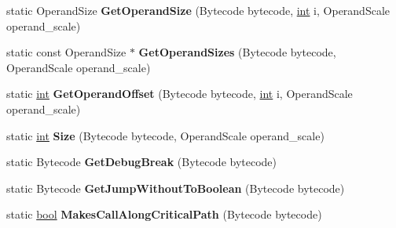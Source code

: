 \begin{DoxyCompactItemize}
\item 
\mbox{\label{classv8_1_1internal_1_1interpreter_1_1Bytecodes_a181117fa745d9bb3d84ee585c778ed94}} 
static Operand\+Size {\bfseries Get\+Operand\+Size} (Bytecode bytecode, \mbox{\hyperlink{classint}{int}} i, Operand\+Scale operand\+\_\+scale)
\item 
\mbox{\label{classv8_1_1internal_1_1interpreter_1_1Bytecodes_a83ff97f25c969cf0781233dde8d21572}} 
static const Operand\+Size $\ast$ {\bfseries Get\+Operand\+Sizes} (Bytecode bytecode, Operand\+Scale operand\+\_\+scale)
\item 
\mbox{\label{classv8_1_1internal_1_1interpreter_1_1Bytecodes_a28b2da32169415a2c614004ab991d696}} 
static \mbox{\hyperlink{classint}{int}} {\bfseries Get\+Operand\+Offset} (Bytecode bytecode, \mbox{\hyperlink{classint}{int}} i, Operand\+Scale operand\+\_\+scale)
\item 
\mbox{\label{classv8_1_1internal_1_1interpreter_1_1Bytecodes_aa36d92e9553de50e7137dcea9afaa212}} 
static \mbox{\hyperlink{classint}{int}} {\bfseries Size} (Bytecode bytecode, Operand\+Scale operand\+\_\+scale)
\item 
\mbox{\label{classv8_1_1internal_1_1interpreter_1_1Bytecodes_a73c15d2ef6e681eb36695d40f787f521}} 
static Bytecode {\bfseries Get\+Debug\+Break} (Bytecode bytecode)
\item 
\mbox{\label{classv8_1_1internal_1_1interpreter_1_1Bytecodes_a3c26a67c2ae1b3a3c13ba669cc387154}} 
static Bytecode {\bfseries Get\+Jump\+Without\+To\+Boolean} (Bytecode bytecode)
\item 
\mbox{\label{classv8_1_1internal_1_1interpreter_1_1Bytecodes_a3adceda5bd96e2e34b5a3b1f63d2aa2a}} 
static \mbox{\hyperlink{classbool}{bool}} {\bfseries Makes\+Call\+Along\+Critical\+Path} (Bytecode bytecode)
\item 
\mbox{\label{classv8_1_1internal_1_1interpreter_1_1Bytecodes_ae2a793a337111484af7c2915f094b7d0}} 

\end{DoxyCompactItemize}
